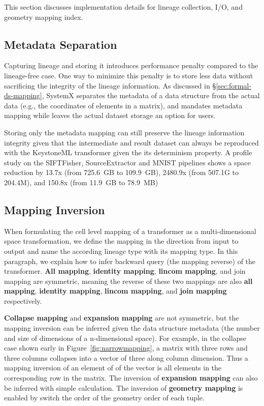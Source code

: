 \documentclass{sig-alternate}
\begin{document}
This section discusses implementation details for lineage collection, I/O, and geometry mapping index.

\subsection{Metadata Separation}
Capturing lineage and storing it introduces performance penalty compared to the lineage-free case. 
One way to minimize this penalty is to store less data without sacrificing the integrity of the lineage information.
As discussed in \S\ref{sec:formal-ds-mapping}, SystemX separates the metadata of a data structure from the 
actual data (e.g., the coordinates of elements in a matrix), and mandates metadata mapping while leaves
the actual dataset storage an option for users.

Storing only the metadata mapping can still preserve the lineage information integrity given that the intermediate and result 
dataset can always be reproduced with the KeystoneML transformer given the its determinism property. 
A profile study on the SIFTFisher, SourceExtractor and MNIST pipelines shows a space reduction by 
13.7x (from 725.6~GB to 109.9~GB), 2480.9x (from 507.1G to 204.4M), and 150.8x (from 11.9~GB to 78.9~MB)

\subsection{Mapping Inversion}
When formulating the cell level mapping of a transformer as a multi-dimensional space transformation, we define
the mapping in the direction from input to output and name the according lineage type with its mapping type.
In this paragraph, we explain how to infer backward query (the mapping reverse) of the transformer.
{\bf All mapping}, {\bf identity mapping}, {\bf lincom mapping}, and {join mapping} are symmetric, 
meaning the reverse of these two mappings are also {\bf all mapping}, {\bf identity mapping}, 
{\bf lincom mapping}, and {\bf join mapping} respectively.

{\bf Collapse mapping} and {\bf expansion mapping} are not symmetric, but the mapping inversion can be inferred
given the data structure metadata (the number and size of dimensions of a n-dimensional space). For example, 
in the collapse case shown early in Figure~\ref{fig:narrowmapping}, a matrix with three rows and three columns
collapses into a vector of three along column dimension. Thus a mapping inversion of an element of of the vector
is all elements in the corresponding row in the matrix. 
The inversion of {\bf expansion mapping} can also be inferred with simple calculation.
The inversion of {\bf geometry mapping} is enabled by switch the order of the geometry order of each tuple.
\end{document}
